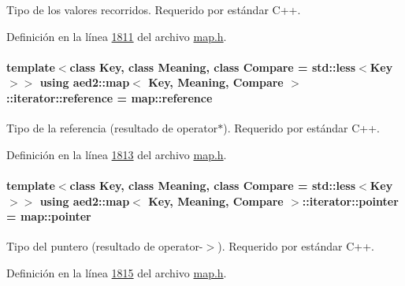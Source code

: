 Tipo de los valores recorridos. Requerido por estándar C++. 



Definición en la línea \hyperlink{map_8h_source_l01811}{1811} del archivo \hyperlink{map_8h_source}{map.\+h}.

\paragraph[{\texorpdfstring{reference}{reference}}]{\setlength{\rightskip}{0pt plus 5cm}template$<$class Key, class Meaning, class Compare = std\+::less$<$\+Key$>$$>$ using {\bf aed2\+::map}$<$ Key, Meaning, Compare $>$\+::{\bf iterator\+::reference} =  {\bf map\+::reference}}\hypertarget{classaed2_1_1map_1_1iterator_ac19788914a3110897e44c53f1318f6af_ac19788914a3110897e44c53f1318f6af}{}\label{classaed2_1_1map_1_1iterator_ac19788914a3110897e44c53f1318f6af_ac19788914a3110897e44c53f1318f6af}


Tipo de la referencia (resultado de operator$\ast$). Requerido por estándar C++. 



Definición en la línea \hyperlink{map_8h_source_l01813}{1813} del archivo \hyperlink{map_8h_source}{map.\+h}.

\paragraph[{\texorpdfstring{pointer}{pointer}}]{\setlength{\rightskip}{0pt plus 5cm}template$<$class Key, class Meaning, class Compare = std\+::less$<$\+Key$>$$>$ using {\bf aed2\+::map}$<$ Key, Meaning, Compare $>$\+::{\bf iterator\+::pointer} =  {\bf map\+::pointer}}\hypertarget{classaed2_1_1map_1_1iterator_a52ea7bdbf1dc6b252aec76633564bdf5_a52ea7bdbf1dc6b252aec76633564bdf5}{}\label{classaed2_1_1map_1_1iterator_a52ea7bdbf1dc6b252aec76633564bdf5_a52ea7bdbf1dc6b252aec76633564bdf5}


Tipo del puntero (resultado de operator-\/$>$). Requerido por estándar C++. 



Definición en la línea \hyperlink{map_8h_source_l01815}{1815} del archivo \hyperlink{map_8h_source}{map.\+h}.

